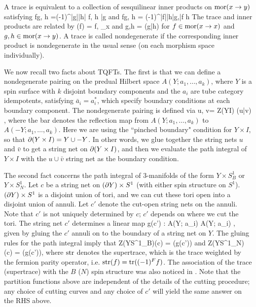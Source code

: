 A trace is equivalent to a collection of sesquilinear inner products on $\text{mor}(x\to y)$ satisfying
\be
	\langle fg, h \rangle =(-1)^{|g||h|} \langle f, h \bar{g} \rangle \;\;\; {\rm and} \;\;\; \langle fg, h \rangle = (-1)^{|f||h|}\langle g,\bar{f}  h  \rangle 
\ee
The trace and inner products are related by
\be
\label{trace_to_innerproduct}
	\tr(f) = \langle f, \id_x \rangle   \;\;\; {\rm and} \;\;\;   \langle g,h \rangle = \tr(g\bar{h})
\ee
for $f\in\text{mor}(x\to x)$ and  $g,h\in\text{mor}(x\to y)$.
A trace is called nondegenerate if the corresponding inner product is nondegenerate in the usual sense (on each morphism space individually).

\medskip

We now recall two facts about TQFTs.
The first is that we can define a nondegenerate pairing on the predual Hilbert
space $A(Y; a_1,\ldots,a_k)$, where $Y$ is a spin surface with $k$ disjoint boundary components 
and the $a_i$ are tube category idempotents, satisfying
$\bar a_i = a^*_i$, which specify boundary conditions at each boundary component.
The nondegenerate pairing is defined via
\be
	\langle u, v\rangle = Z(Y\times I) (u\cup \bar v) ,
\ee
where the bar denotes the reflection map from 
$A(Y; a_1,\ldots,a_k)$ to $A(-Y; a_1,\ldots,a_k)$.
Here we are using the ``pinched boundary" condition for $Y\times I$, so that $\partial (Y\times I) = Y\cup -Y$.
In other words, we glue together the string nets $u$ and $\bar v$ to get a string net on $\partial (Y\times I)$, and then we evaluate
the path integral of $Y\times I$ with the $u\cup \bar v$ string net as the boundary condition.

The second fact concerns the path integral of 3-manifolds of the form $Y\times S^1_B$ or $Y\times S^1_N$.
Let $c$ be a string net on $(\partial Y)\times S^1$ (with either spin structure on $S^1$).
$(\partial Y)\times S^1$ is a disjoint union of tori, and we can cut these tori open into a disjoint union of annuli.
Let $c'$ denote the cut-open string nets on the annuli.
Note that $c'$ is not uniquely determined by $c$; $c'$ depends on where we cut the tori.
The string net $c'$ determines a linear map
\be
	g(c') : A(Y; a_i) \to A(Y; a_i) ,
\ee
given by gluing the $c'$ annuli on to the boundary of a string net on $Y$.
The gluing rules for the path integral imply that
\be
\label{bounding_trace}
	Z(Y\times S^1_B)(c) = \tr(g(c'))
\ee
and
\be
\label{nonbounding_trace}
	Z(Y\times S^1_N)(c) = \str(g(c')),
\ee
where $\text{str}$ denotes the supertrace, which is the trace weighted by the fermion parity operator, i.e. $\text{str}(f) = \text{tr}((-1)^F f)$.
The association of the trace (supertrace) with the $B$ ($N$) spin structure was 
also noticed in \cite{turzillo2016}. 
Note that the partition functions above are independent of the details of the cutting procedure;
any choice of cutting curves and any choice of $c'$ will yield the same answer on the RHS above.

